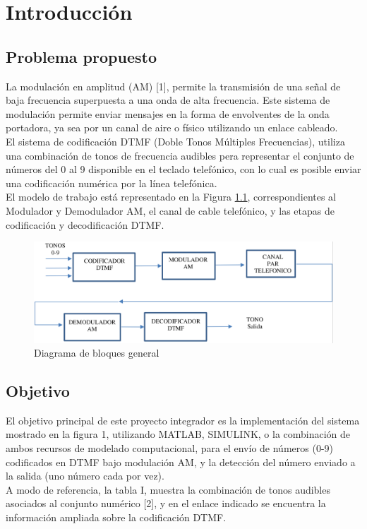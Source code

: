 \chapter{Introducción}
\section{Problema propuesto}
La modulación en amplitud (AM) [1],
permite la transmisión de una señal de
baja frecuencia superpuesta a una onda
de alta frecuencia. Este sistema de
modulación permite enviar mensajes en
la forma de envolventes de la onda
portadora, ya sea por un canal de aire o
físico utilizando un enlace cableado.\\
El sistema de codificación DTMF (Doble
Tonos Múltiples Frecuencias), utiliza una
combinación de tonos de frecuencia
audibles pera representar el conjunto de
números del 0 al 9 disponible en el
teclado telefónico, con lo cual es posible
enviar una codificación numérica por la
línea telefónica.\\
El modelo de trabajo está representado
en la Figura \ref{fig:fig_intro_diagrama_bloques}, correspondientes al
Modulador y Demodulador AM, el canal
de cable telefónico, y las etapas de
codificación y decodificación DTMF.

\begin{figure}[ht]
  \centering
  \includegraphics[width=\linewidth]{images/intro_diagrama_general.png}
  \caption{Diagrama de bloques general}
  \label{fig:fig_intro_diagrama_bloques}
\end{figure}

\section{Objetivo}
El objetivo principal de este proyecto
integrador es la implementación del
sistema mostrado en la figura 1,
utilizando MATLAB, SIMULINK, o la
combinación de ambos recursos de
modelado computacional, para el
envío de números (0-9) codificados
en DTMF bajo modulación AM, y la
detección del número enviado a la
salida (uno número cada por vez).\\
A modo de referencia, la tabla I,
muestra la combinación de tonos
audibles asociados al conjunto
numérico [2], y en el enlace indicado
se encuentra la información ampliada
sobre la codificación DTMF.

